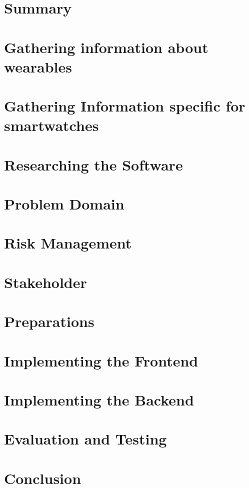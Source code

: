 \chapter{Summary}


\chapter{Gathering information about wearables}


\chapter{Gathering Information specific for smartwatches}


\chapter{Researching the Software}


\chapter{Problem Domain}


\chapter{Risk Management}


\chapter{Stakeholder}


\chapter{Preparations}


\chapter{Implementing the Frontend}


\chapter{Implementing the Backend}


\chapter{Evaluation and Testing}


\chapter{Conclusion}
